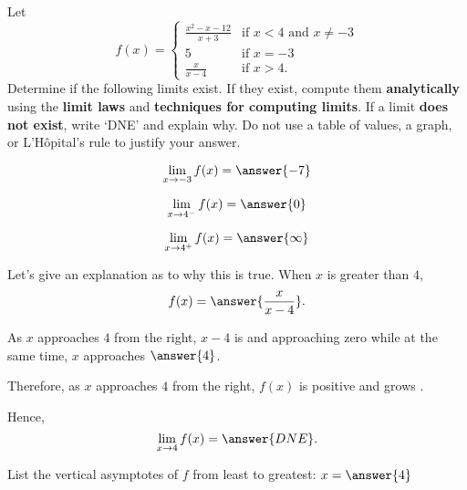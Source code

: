 \documentclass{ximera}
\begin{document}

Let 
\[
f(x)=\begin{cases}
\frac{x^2-x-12}{x+3} & \text{if $x<4$ and $x\ne -3$}\\
5 & \text{if $x=-3$}\\
\frac{x}{x-4} & \text{if $x>4$}.
\end{cases}
\]
Determine if the following limits exist. If they exist, compute them \textbf{analytically} using the \textbf{limit laws} and \textbf{techniques for computing limits}. If a limit \textbf{does not exist}, write `DNE' and explain why.  Do not use a table of values, a graph, or L'H\^opital's rule to justify your answer.
\begin{exercise}
  \[
  \lim_{x\to -3}f(x)=\answer{-7}
  \]
\end{exercise}
\begin{exercise}
  \[
  \lim_{x\to 4^{-}}f(x)=\answer{0}
  \]
\end{exercise}
\begin{exercise}
  \[
  \lim_{x\to 4^+}f(x)=\answer{\infty}
  \]
  \begin{exercise}
    Let's give an explanation as to why this is true. When $x$ is
    greater than $4$,
    \[
    f(x) = \answer{\frac{x}{x-4}}.
    \]
    \begin{exercise}As $x$ approaches $4$ from the right, $x-4$ is  and approaching zero while at the same time, $x$ approaches $\answer{4}$. \begin{exercise} Therefore, as $x$ approaches $4$ from the right, $f(x)$ is positive and grows . \begin{exercise} Hence, 
    \[
    \lim_{x\to 4}f(x)=\answer{DNE}.
    \]
    \end{exercise}
    \end{exercise}
    \end{exercise}
    \end{exercise}    
  \begin{exercise}
    List the vertical asymptotes of $f$ from least to greatest: $x=\answer{4}$
  \end{exercise}
\end{exercise}
\end{document}

